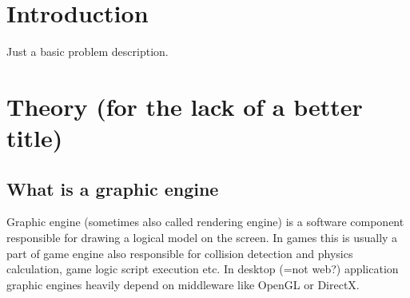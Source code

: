 \documentclass[11pt,oneside, final]{fithesis2}
\begin{document}
  
\FrontMatter  
\ThesisTitlePage  
 
\begin{ThesisDeclaration}  
\DeclarationText  
\AdvisorName  
\end{ThesisDeclaration}  
 
\begin{ThesisThanks}  

\end{ThesisThanks}  
 
\begin{ThesisAbstract}  

\end{ThesisAbstract}  
 
\begin{ThesisKeyWords}  

\end{ThesisKeyWords}  
 
\MainMatter
 
\tableofcontents          %
 
\chapter{Introduction}
Just a basic problem description.

\chapter{Theory (for the lack of a better title)}
\section{What is a graphic engine}
Graphic engine (sometimes also called rendering engine) is a software component responsible for drawing a logical model on the screen. In games this is usually a part of game engine also responsible for collision detection and physics calculation, game logic script execution etc. In desktop (=not web?) application graphic engines heavily depend on middleware like OpenGL or DirectX. 
\end{document}
